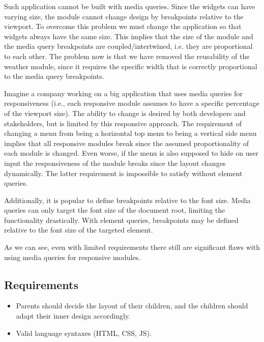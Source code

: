 \documentclass{acm_proc_article-sp}
\begin{document}
    Such application cannot be built with media queries.
    Since the widgets can have varying size, the module cannot change design by breakpoints relative to the viewport.
    To overcome this problem we must change the application so that widgets always have the same size.
    This implies that the size of the module and the media query breakpoints are coupled/intertwined, i.e. they are proportional to each other.
    The problem now is that we have removed the reusability of the weather module, since it requires the specific width that is correctly proportional to the media query breakpoints. 

    Imagine a company working on a big application that uses media queries for responsiveness (i.e., each responsive module assumes to have a specific percentage of the viewport size).
    The ability to change is desired by both developers and stakeholders, but is limited by this responsive approach.
    The requirement of changing a menu from being a horizontal top menu to being a vertical side menu implies that all responsive modules break since the assumed proportionality of each module is changed.
    Even worse, if the menu is also supposed to hide on user input the responsiveness of the module breaks since the layout changes dynamically.
    The latter requirement is impossible to satisfy without element queries.

    Additionally, it is popular to define breakpoints relative to the font size.
    Media queries can only target the font size of the document root, limiting the functionality drastically.
    With element queries, breakpoints may be defined relative to the font size of the targeted element.

    As we can see, even with limited requirements there still are significant flaws with using media queries for responsive modules.

    \subsection{Requirements}
      \begin{itemize}
        \item Parents should decide the layout of their children, and the children should adapt their inner design accordingly.
        \item Valid language syntaxes (HTML, CSS, JS).
      \end{itemize}
\end{document}
